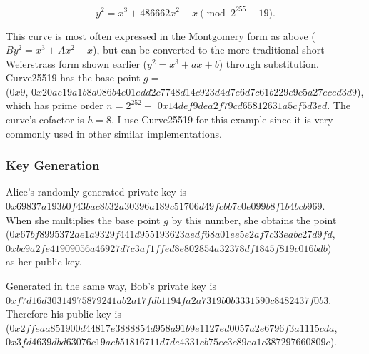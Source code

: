 \documentclass[12pt,a4paper]{article}
\begin{document}
\begin{equation}
    y^2 = x^3 + 486662x^2 + x \pmod{2^{255}-19}.
\end{equation}

This curve is most often expressed in the Montgomery \citeyear{montgomery1987speeding} form as above ($By^2 = x^3 + Ax^2 + x$), 
but can be converted to the more traditional short Weierstrass form shown earlier ($y^2 = x^3 + ax + b$) through substitution. 
Curve25519 has the base point $g = $ \\
({\footnotesize $0x9$}, {\footnotesize $0x20ae19a1b8a086b4e01edd2c7748d14c923d4d7e6d7c61b229e9c5a27eced3d9$}), \\
which has prime order $n = 2^{252} +$ {\footnotesize $0x14def9dea2f79cd65812631a5cf5d3ed$}. 
The curve's cofactor is $h = 8$. 
I use Curve25519 for this example since it is very commonly used in other similar implementations. 


\subsubsection{Key Generation} \noindent
Alice's randomly generated private key is \\
{\footnotesize $0x69837a193b0f43bac8b32a30396a189c51706d49fcbb7c0e099b8f1b4bcb969$}. \\
When she multiplies the base point $g$ by this number, she obtains the point \\
({\footnotesize $0x67bf8995372ae1a9329f441d955193623aedf68a01ee5e2af7c33eabc27d9fd$}, \\
{\footnotesize $0xbc9a2fe41909056a46927d7c3af1ffed8e802854a32378df1845f819c016bdb$}) \\
as her public key.

Generated in the same way, Bob's private key is \\
{\footnotesize $0xf7d16d30314975879241ab2a17fdb1194fa2a7319b0b3331590c8482437f0b3$}. \\
Therefore his public key is \\
({\footnotesize $0x2ffeaa851900d44817e3888854d958a91b9e1127ed0057a2e6796f3a1115cda$}, \\
{\footnotesize $0x3fd4639dbd63076c19aeb51816711d7de4331cb75ec3c89ea1c387297660809c$}).
\end{document}
